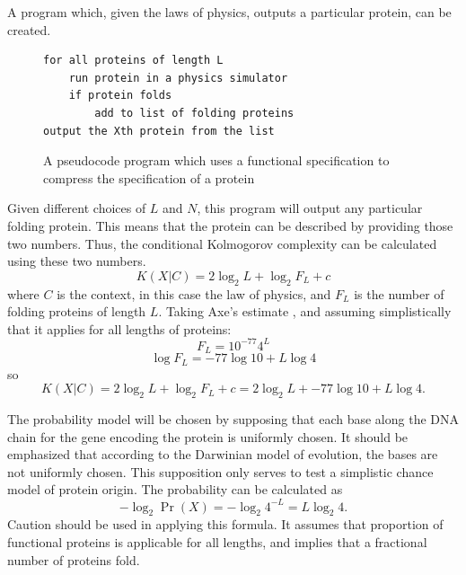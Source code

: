 A program which, given the laws of physics, outputs a particular protein, can be created.
\begin{figure}[H]
\begin{mdframed}
\begin{verbatim}
for all proteins of length L
    run protein in a physics simulator
    if protein folds
        add to list of folding proteins
output the Xth protein from the list
\end{verbatim}
\end{mdframed}
\caption{A pseudocode program which uses a functional specification to compress the specification of a protein}
\end{figure}

Given different choices of $L$ and $N$, this program will output any particular folding protein.
This means that the protein can be described by providing those two numbers.  Thus, the conditional Kolmogorov complexity can be calculated using these two numbers.
\begin{equation}
    K(X|C) = 2 \log_2 L + \log_2 F_L + c
\end{equation} where $C$ is the context, in this case the law of physics,
and $F_L$ is the number of folding proteins of length $L$.
Taking Axe's estimate \citep{axe2004}, and assuming simplistically that it applies for all lengths of proteins:
\begin{equation}
    F_L = 10^{-77} 4^L 
\end{equation}
\begin{equation}
    \log F_L = -77 \log 10 + L \log 4
\end{equation}
so
\begin{equation}
    K(X|C) = 2 \log_2 L + \log_2 F_L + c = 2 \log_2 L + -77 \log 10  + L \log 4 \mbox{.}
\end{equation}

The probability model will be chosen by supposing that each base along the DNA chain for the gene encoding the protein is uniformly chosen.
It should be emphasized that according to the Darwinian model of evolution, the bases are not uniformly chosen.
This supposition only serves to test a simplistic chance model of protein origin.
The probability can be calculated as
\begin{equation}
    -\log_2 \Pr(X) =  -\log_2 4^{-L} = L \log_2 4 \mbox{.}
\end{equation}
Caution should be used in applying this formula.
It assumes that proportion of functional proteins is applicable for all lengths, and implies that a fractional number of proteins fold.


